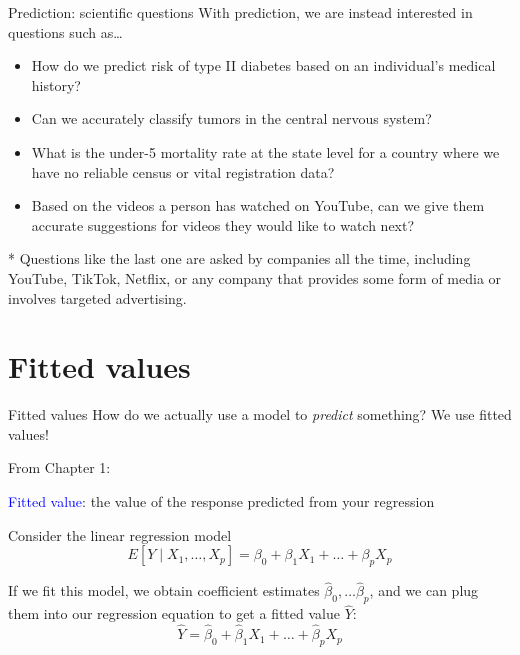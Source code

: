 \documentclass[10pt,t]{beamer}
\begin{document}
\begin{frame}{Prediction: scientific questions}
With prediction, we are instead interested in questions such as\dots

\vspace{0.3cm}

\begin{itemize}
	\item How do we predict risk of type II diabetes based on an individual's medical history?
	\medskip
	
	\item Can we accurately classify tumors in the central nervous system?
	
	\medskip
	
	\item What is the under-5 mortality rate at the state level for a country where we have no reliable census or vital registration data?
	\medskip
	
	\item Based on the videos a person has watched on YouTube, can we give them accurate suggestions for videos they would like to watch next?
\end{itemize}

\vspace{0.3cm} \pause

* Questions like the last one are asked by companies all the time, including YouTube, TikTok, Netflix, or any company that provides some form of media or involves targeted advertising. 
\end{frame}


\section{Fitted values}

\begin{frame}{Fitted values}
How do we actually use a model to \textit{predict} something? We use fitted values!

\vspace{0.3cm}

From Chapter 1:

\vspace{0.3cm}

\textcolor{blue}{Fitted value}: the value of the response predicted from your regression \pause

\vspace{0.3cm}

Consider the linear regression model
$$
E[Y \mid X_1, \dots, X_p] = \beta_0 + \beta_1 X_1 + \dots + \beta_p X_p
$$

If we fit this model, we obtain coefficient estimates $\hat{\beta}_0, \dots \hat{\beta}_p$, and we can plug them into our regression equation to get a fitted value $\hat{Y}$:
$$
\hat{Y} = \hat{\beta}_0 + \hat{\beta}_1 X_1 + \dots + \hat{\beta}_p X_p
$$

\end{frame}
\end{document}
